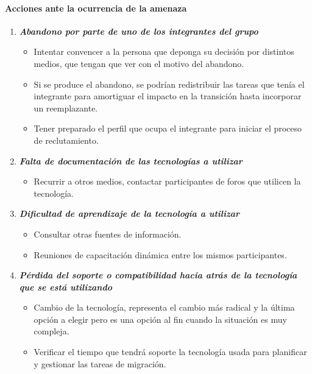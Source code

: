 \paragraph{Acciones ante la ocurrencia de la amenaza}

	\begin{enumerate}
		\item \textbf{\textit{Abandono por parte de uno de los integrantes del grupo}}
        	\begin{itemize}
				\item Intentar convencer a la persona que deponga su decisión por distintos medios, que tengan que ver con el motivo del abandono.
                \item Si se produce el abandono, se podrían redistribuir las tareas que tenía el integrante para amortiguar el impacto en la transición hasta incorporar un reemplazante.
                \item Tener preparado el perfil que ocupa el integrante para iniciar el proceso de reclutamiento.
			\end{itemize}
        \item \textbf{\textit{Falta de documentación de las tecnologías a utilizar}}
        	\begin{itemize}
				\item Recurrir a otros medios, contactar participantes de foros que utilicen la tecnología.              
			\end{itemize}
        \item \textbf{\textit{Dificultad de aprendizaje de la tecnología a utilizar}}
        	\begin{itemize}
				\item Consultar otras fuentes de información.
                \item Reuniones de capacitación dinámica entre los mismos participantes.
			\end{itemize}
        \item \textbf{\textit{Pérdida del soporte o compatibilidad hacia atrás de la tecnología que se está utilizando}}
        	\begin{itemize}
				\item Cambio de la tecnología, representa el cambio más radical y la última opción a elegir pero es una opción al fin cuando la situación es muy compleja.
                \item Verificar el tiempo que tendrá soporte la tecnología usada para planificar y gestionar las tareas de migración.
			\end{itemize}

\end{enumerate}
